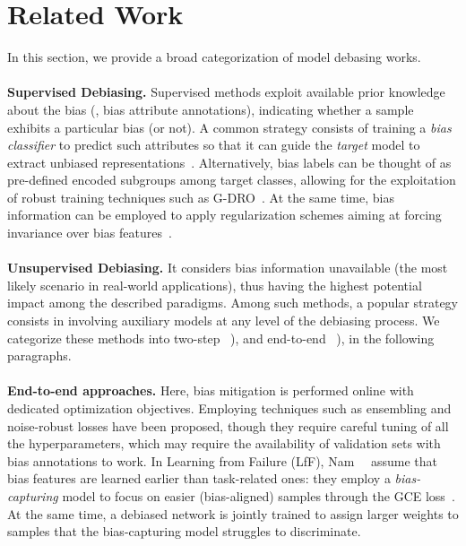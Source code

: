 \section{Related Work}
In this section, we provide a broad categorization of model debasing works. 
\label{sec:rel-work}
\noindent
\\
\\
\textbf{Supervised Debiasing.} Supervised methods exploit available prior knowledge about the bias (\eg, bias attribute annotations), indicating whether a sample exhibits a particular bias (or not).  A common strategy consists of training a \textit{bias classifier} to predict such attributes so that it can guide the \textit{target} model to extract unbiased representations~\cite{alvi2018turning, Xie2017ControllableIT}. Alternatively, bias labels can be thought of as pre-defined encoded subgroups among target classes, allowing for the exploitation of robust training techniques such as G-DRO~\cite{Sagawa*2020Distributionally}. At the same time, bias information can be employed to apply regularization schemes aiming at forcing invariance over bias features~\cite{barbano2023unbiased,tartaglione2021end}.\\ 
\noindent
\\
\textbf{Unsupervised Debiasing.} It considers bias information unavailable (the most likely scenario in real-world applications), thus having the highest potential impact among the described paradigms. Among such methods, a popular strategy consists in involving auxiliary models at any level of the debiasing process. We categorize these methods into two-step  ~\cite{pmlr-v139-liu21f_JTT, sohoni2020no, kim2021biaswap}), and end-to-end ~\cite{nam2020learning, li2022discover}), in the following paragraphs. \\
\\
\textbf{End-to-end approaches.} Here, bias mitigation is performed online with dedicated optimization objectives. Employing techniques such as ensembling and noise-robust losses have been proposed, though they require careful tuning of all the hyperparameters, which may require the availability of validation sets with bias annotations to work. In Learning from Failure (LfF), Nam~\etal~\cite{nam2020learning} assume that bias features are learned earlier than task-related ones: they employ a \textit{bias-capturing} model to focus on easier (bias-aligned) samples through the GCE loss~\cite{zhang2018gce}. At the same time, a debiased network is jointly trained to assign larger weights to samples that the bias-capturing model struggles to discriminate. 
